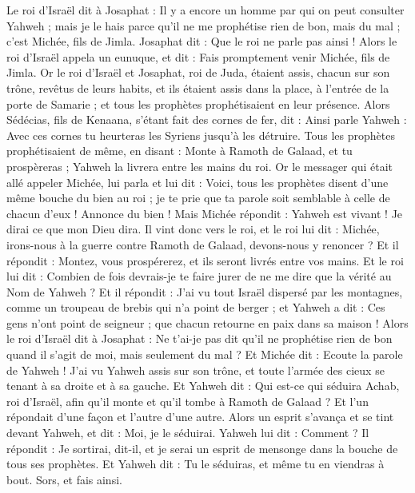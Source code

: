\begin{multicols}{2}
Le roi d'Israël dit à Josaphat : Il y a encore un homme par qui on peut consulter Yahweh ; mais je le hais parce qu'il ne me prophétise rien de bon, mais du mal ; c'est Michée, fils de Jimla. Josaphat dit : Que le roi ne parle pas ainsi !
Alors le roi d'Israël appela un eunuque, et dit : Fais promptement venir Michée, fils de Jimla.
Or le roi d'Israël et Josaphat, roi de Juda, étaient assis, chacun sur son trône, revêtus de leurs habits, et ils étaient assis dans la place, à l'entrée de la porte de Samarie ; et tous les prophètes prophétisaient en leur présence.
Alors Sédécias, fils de Kenaana, s'étant fait des cornes de fer, dit : Ainsi parle Yahweh : Avec ces cornes tu heurteras les Syriens jusqu'à les détruire.
Tous les prophètes prophétisaient de même, en disant : Monte à Ramoth de Galaad, et tu prospèreras ; Yahweh la livrera entre les mains du roi.
Or le messager qui était allé appeler Michée, lui parla et lui dit : Voici, tous les prophètes disent d'une même bouche du bien au roi ; je te prie que ta parole soit semblable à celle de chacun d'eux ! Annonce du bien !
Mais Michée répondit : Yahweh est vivant ! Je dirai ce que mon Dieu dira.
Il vint donc vers le roi, et le roi lui dit : Michée, irons-nous à la guerre contre Ramoth de Galaad, devons-nous y renoncer ? Et il répondit : Montez, vous prospérerez, et ils seront livrés entre vos mains.
Et le roi lui dit : Combien de fois devrais-je te faire jurer de ne me dire que la vérité au Nom de Yahweh ?
Et il répondit : J'ai vu tout Israël dispersé par les montagnes, comme un troupeau de brebis qui n'a point de berger ; et Yahweh a dit : Ces gens n'ont point de seigneur ; que chacun retourne en paix dans sa maison !
Alors le roi d'Israël dit à Josaphat : Ne t'ai-je pas dit qu'il ne prophétise rien de bon quand il s'agit de moi, mais seulement du mal ?
Et Michée dit : Ecoute la parole de Yahweh ! J'ai vu Yahweh assis sur son trône, et toute l'armée des cieux se tenant à sa droite et à sa gauche.
Et Yahweh dit : Qui est-ce qui séduira Achab, roi d'Israël, afin qu'il monte et qu'il tombe à Ramoth de Galaad ? Et l'un répondait d'une façon et l'autre d'une autre.
Alors un esprit s'avança et se tint devant Yahweh, et dit : Moi, je le séduirai. Yahweh lui dit : Comment ?
Il répondit : Je sortirai, dit-il, et je serai un esprit de mensonge dans la bouche de tous ses prophètes. Et Yahweh dit : Tu le séduiras, et même tu en viendras à bout. Sors, et fais ainsi.

\end{multicols}
